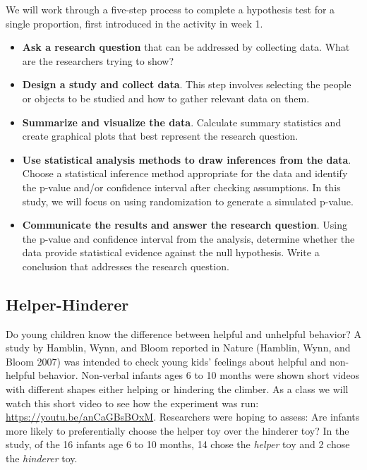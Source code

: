 \documentclass[
]{report}
\begin{document}
We will work through a five-step process to complete a hypothesis test for a single proportion, first introduced in the activity in week 1.

\begin{itemize}
\item
  \textbf{Ask a research question} that can be addressed by collecting data. What are the researchers trying to show?
\item
  \textbf{Design a study and collect data}. This step involves selecting the people or objects to be studied and how to gather relevant data on them.
\item
  \textbf{Summarize and visualize the data}. Calculate summary statistics and create graphical plots that best represent the research question.
\item
  \textbf{Use statistical analysis methods to draw inferences from the data}. Choose a statistical inference method appropriate for the data and identify the p-value and/or confidence interval after checking assumptions. In this study, we will focus on using randomization to generate a simulated p-value.
\item
  \textbf{Communicate the results and answer the research question}. Using the p-value and confidence interval from the analysis, determine whether the data provide statistical evidence against the null hypothesis. Write a conclusion that addresses the research question.
\end{itemize}

\newpage

\hypertarget{helper-hinderer}{%
\subsection{Helper-Hinderer}\label{helper-hinderer}}

Do young children know the difference between helpful and unhelpful behavior? A study by Hamblin, Wynn, and Bloom reported in Nature (Hamblin, Wynn, and Bloom 2007) was intended to check young kids' feelings about helpful and non-helpful behavior. Non-verbal infants ages 6 to 10 months were shown short videos with different shapes either helping or hindering the climber. As a class we will watch this short video to see how the experiment was run: \url{https://youtu.be/anCaGBsBOxM}. Researchers were hoping to assess: Are infants more likely to preferentially choose the helper toy over the hinderer toy? In the study, of the 16 infants age 6 to 10 months, 14 chose the \emph{helper} toy and 2 chose the \emph{hinderer} toy.
\end{document}
